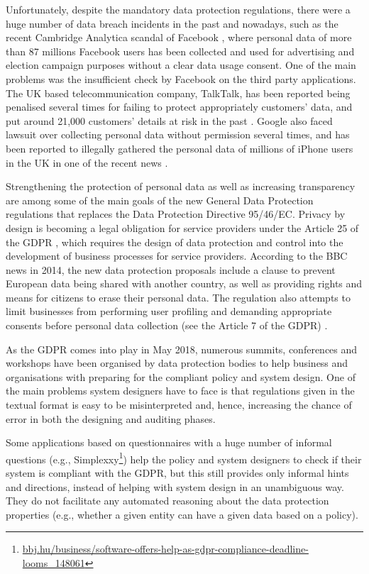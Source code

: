 \documentclass[a4paper]{article}
\begin{document}
Unfortunately, despite the mandatory data protection regulations,  there were a huge number of data breach incidents in the past \cite{CNET-012014, Bloomberg-012014, Guardian-032015, Guardian-062015, Guardian-122014, Engaget-072015} and nowadays, such as the recent Cambridge Analytica scandal of Facebook \cite{Faceanalytica17}, where personal data of more than 87 millions Facebook users has been collected and used for advertising and election campaign purposes without a clear data usage consent. One of the main problems was the insufficient check by Facebook on the third party applications. The UK based telecommunication company, TalkTalk, has been reported being penalised several times for failing to protect appropriately customers' data, and put around 21,000 customers' details at risk in the past \cite{Talktalk}. Google also faced lawsuit over collecting personal data without permission several times, and has been reported to illegally gathered the personal data of millions of iPhone users in the UK in one of the recent news \cite{Google}. 

Strengthening the protection of personal data as well as increasing transparency are among some of the main goals of the new General Data Protection regulations that  replaces the Data Protection Directive 95/46/EC. Privacy by design is becoming a legal obligation for service providers  under the Article 25 of the GDPR \cite{Gdpr25}, which requires the design of data protection and control  into the development of business processes for service providers.  According to the BBC news \cite{BBC-012014} in 2014, the new data protection proposals include a clause to prevent European data being shared with another country, as well as providing rights and means for citizens to erase their personal data. 
The regulation also attempts to limit businesses from performing user profiling and demanding appropriate consents before personal data collection (see the Article 7 of the GDPR) \cite{Gdpr7}. 

As the GDPR comes into play in May 2018, numerous summits, conferences and workshops have been organised by data protection bodies to help business and organisations with preparing for the compliant policy and system design. One of the main problems system designers have to face is that regulations given in the textual format is easy to be misinterpreted and, hence, increasing the chance of error in both the designing and auditing phases.    

Some applications based on questionnaires with a huge number of informal questions  (e.g., Simplexxy\footnote{\url{bbj.hu/business/software-offers-help-as-gdpr-compliance-deadline-looms_148061}}) help the policy and system designers to check if their system is compliant with the GDPR, but this still provides only informal hints and directions, instead of helping with system design in an unambiguous way. They do not facilitate any automated reasoning about the data protection properties (e.g., whether a given entity can have a given data based on a policy). 
\end{document}
